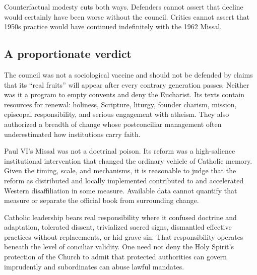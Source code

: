 Counterfactual modesty cuts both ways. Defenders cannot assert that decline would certainly have been worse without the council. Critics cannot assert that 1950s practice would have continued indefinitely with the 1962 Missal.

\subsection{A proportionate verdict}

The council was not a sociological vaccine and should not be defended by claims that its “real fruits” will appear after every contrary generation passes. Neither was it a program to empty convents and deny the Eucharist. Its texts contain resources for renewal: holiness, Scripture, liturgy, founder charism, mission, episcopal responsibility, and serious engagement with atheism. They also authorized a breadth of change whose postconciliar management often underestimated how institutions carry faith.

Paul VI's Missal was not a doctrinal poison. Its reform was a high-salience institutional intervention that changed the ordinary vehicle of Catholic memory. Given the timing, scale, and mechanisms, it is reasonable to judge that the reform as distributed and locally implemented contributed to and accelerated Western disaffiliation in some measure. Available data cannot quantify that measure or separate the official book from surrounding change.

Catholic leadership bears real responsibility where it confused doctrine and adaptation, tolerated dissent, trivialized sacred signs, dismantled effective practices without replacements, or hid grave sin. That responsibility operates beneath the level of conciliar validity. One need not deny the Holy Spirit's protection of the Church to admit that protected authorities can govern imprudently and subordinates can abuse lawful mandates.

